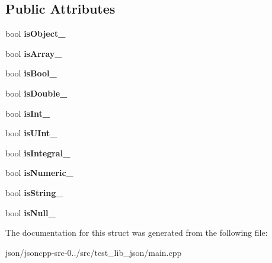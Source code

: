 \subsection*{Public Attributes}
\begin{DoxyCompactItemize}
\item 
\hypertarget{struct_value_test_1_1_is_check_abd2aa2b9a6c4ddb0c89235b15072797f}{bool {\bfseries is\+Object\+\_\+}}\label{struct_value_test_1_1_is_check_abd2aa2b9a6c4ddb0c89235b15072797f}

\item 
\hypertarget{struct_value_test_1_1_is_check_af60036059401ebba16c725e13aa4244a}{bool {\bfseries is\+Array\+\_\+}}\label{struct_value_test_1_1_is_check_af60036059401ebba16c725e13aa4244a}

\item 
\hypertarget{struct_value_test_1_1_is_check_a86fc6724fb2d7b867a2b3913e36a6b5d}{bool {\bfseries is\+Bool\+\_\+}}\label{struct_value_test_1_1_is_check_a86fc6724fb2d7b867a2b3913e36a6b5d}

\item 
\hypertarget{struct_value_test_1_1_is_check_a752656c2a6909f7b9223ec640f59eaa7}{bool {\bfseries is\+Double\+\_\+}}\label{struct_value_test_1_1_is_check_a752656c2a6909f7b9223ec640f59eaa7}

\item 
\hypertarget{struct_value_test_1_1_is_check_a27eb3abe6b905ca6f96b5773a9aabd15}{bool {\bfseries is\+Int\+\_\+}}\label{struct_value_test_1_1_is_check_a27eb3abe6b905ca6f96b5773a9aabd15}

\item 
\hypertarget{struct_value_test_1_1_is_check_ad00b646a3fad94ae94f21562d29cb106}{bool {\bfseries is\+U\+Int\+\_\+}}\label{struct_value_test_1_1_is_check_ad00b646a3fad94ae94f21562d29cb106}

\item 
\hypertarget{struct_value_test_1_1_is_check_a39d39cc14b10a0983f2fc2acdbc417c7}{bool {\bfseries is\+Integral\+\_\+}}\label{struct_value_test_1_1_is_check_a39d39cc14b10a0983f2fc2acdbc417c7}

\item 
\hypertarget{struct_value_test_1_1_is_check_ad1bb16177393737e6da5485673845689}{bool {\bfseries is\+Numeric\+\_\+}}\label{struct_value_test_1_1_is_check_ad1bb16177393737e6da5485673845689}

\item 
\hypertarget{struct_value_test_1_1_is_check_a0eefb9d950656c9f64aa68842658d577}{bool {\bfseries is\+String\+\_\+}}\label{struct_value_test_1_1_is_check_a0eefb9d950656c9f64aa68842658d577}

\item 
\hypertarget{struct_value_test_1_1_is_check_a640ce2c23132d89e37cd9c1af3824be8}{bool {\bfseries is\+Null\+\_\+}}\label{struct_value_test_1_1_is_check_a640ce2c23132d89e37cd9c1af3824be8}

\end{DoxyCompactItemize}


The documentation for this struct was generated from the following file\+:\begin{DoxyCompactItemize}
\item 
json/jsoncpp-\/src-\/0../src/test\+\_\+lib\+\_\+json/main.\+cpp\end{DoxyCompactItemize}
